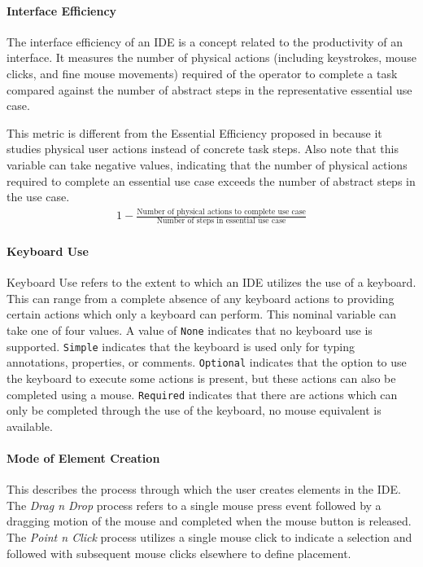 \paragraph{Interface Efficiency} The interface efficiency of an IDE is a
concept related to the productivity of an interface. It measures the number
of physical actions (including keystrokes, mouse clicks, and fine mouse
movements) required of the operator to complete a task compared against
the number of abstract steps in the representative essential use case.

This metric is different from the Essential Efficiency proposed in
\cite{constantine1996} because it studies physical user actions instead of
concrete task steps. Also note that this variable can take negative values,
indicating that the number of physical actions required to complete an
essential use case exceeds the number of abstract steps in the use case.
%
\begin{align}\label{eq:iefficiency}
  1 - \frac{\text{Number of physical actions to complete use case}}
            {\text{Number of steps in essential use case}}
\end{align}


\paragraph{Keyboard Use} Keyboard Use refers to the extent to which an IDE
utilizes the use of a keyboard. This can range from a complete absence of
any keyboard actions to providing certain actions which only a keyboard can
perform. This nominal variable can take one of four values. A value of
\texttt{None} indicates that no keyboard use is supported. \texttt{Simple}
indicates that the keyboard is used only for typing annotations,
properties, or comments. \texttt{Optional} indicates that the option to use
the keyboard to execute some actions is present, but these actions can also
be completed using a mouse. \texttt{Required} indicates that there are
actions which can only be completed through the use of the keyboard, no
mouse equivalent is available.


\paragraph{Mode of Element Creation} This describes the process through
which the user creates elements in the IDE. The \emph{Drag n Drop} process
refers to a single mouse press event followed by a dragging motion of the
mouse and completed when the mouse button is released. The \emph{Point n
Click} process utilizes a single mouse click to indicate a selection and
followed with subsequent mouse clicks elsewhere to define placement.

